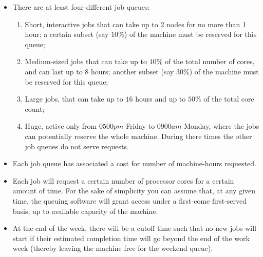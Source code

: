 		\begin{itemize}
			\item
			{
				 There are at least four different job queues:
				 \begin{enumerate}
				 	\item Short, interactive jobs that can take up to $2$ nodes for no more than 1 hour; a certain subset (say $10\%$) of the machine must be reserved for this queue;
				 	\item Medium-sized jobs that can take up to $10\%$ of the total number of cores, and can last up to $8$ hours; another subset (say $30\%$) of the machine must be reserved for this queue;
				 	\item Large jobs, that can take up to $16$ hours and up to $50\%$ of the total core count;
				 	\item Huge, active only from $0500pm$ Friday to $0900am$ Monday, where the jobs can potentially reserve the whole machine. During there times the other job queues do not serve requests.
				 \end{enumerate}
			}
			\item Each job queue has associated a cost for number of machine-hours requested.
			\item Each job will request a certain number of processor cores for a certain amount of time. For the sake of simplicity you can assume that, at any given time, the queuing software will grant access under a first-come first-served basis, up to available capacity of the machine.
			\item At the end of the week, there will be a cutoff time such that no new jobs will start if their estimated completion time will go beyond the end of the work week (thereby leaving the machine free for the weekend queue).
		\end{itemize}
		
		
